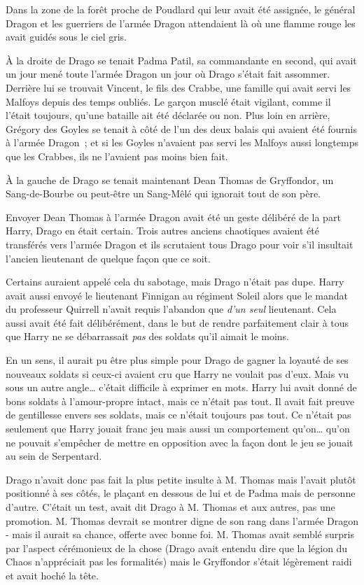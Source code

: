 \later

Dans la zone de la forêt proche de Poudlard qui leur avait été assignée, le général Dragon et les guerriers de l'armée Dragon attendaient là où une flamme rouge les avait guidés sous le ciel gris.

À la droite de Drago se tenait Padma Patil, sa commandante en second, qui avait un jour mené toute l'armée Dragon un jour où Drago s'était fait assommer. Derrière lui se trouvait Vincent, le fils des Crabbe, une famille qui avait servi les Malfoys depuis des temps oubliés. Le garçon musclé était vigilant, comme il l'était toujours, qu'une bataille ait été déclarée ou non. Plus loin en arrière, Grégory des Goyles se tenait à côté de l'un des deux balais qui avaient été fournis à l'armée Dragon~; et si les Goyles n'avaient pas servi les Malfoys aussi longtemps que les Crabbes, ils ne l'avaient pas moins bien fait.

À la gauche de Drago se tenait maintenant Dean Thomas de Gryffondor, un Sang-de-Bourbe ou peut-être un Sang-Mêlé qui ignorait tout de son père.

Envoyer Dean Thomas à l'armée Dragon avait été un geste délibéré de la part Harry, Drago en était certain. Trois autres anciens chaotiques avaient été transférés vers l'armée Dragon et ils scrutaient tous Drago pour voir s'il insultait l'ancien lieutenant de quelque façon que ce soit.

Certains auraient appelé cela du sabotage, mais Drago n'était pas dupe. Harry avait aussi envoyé le lieutenant Finnigan au régiment Soleil alors que le mandat du professeur Quirrell n'avait requis l'abandon que \emph{d'un seul} lieutenant. Cela aussi avait été fait délibérément, dans le but de rendre parfaitement clair à tous que Harry ne se débarrassait \emph{pas} des soldats qu'il aimait le moins.

En un sens, il aurait pu être plus simple pour Drago de gagner la loyauté de ses nouveaux soldats si ceux-ci avaient cru que Harry ne voulait pas d'eux. Mais vu sous un autre angle… c'était difficile à exprimer en mots. Harry lui avait donné de bons soldats à l'amour-propre intact, mais ce n'était pas tout. Il avait fait preuve de gentillesse envers ses soldats, mais ce n'était toujours pas tout. Ce n'était pas seulement que Harry jouait franc jeu mais aussi un comportement qu'on… qu'on ne pouvait s'empêcher de mettre en opposition avec la façon dont le jeu se jouait au sein de Serpentard.

Drago n'avait donc pas fait la plus petite insulte à M. Thomas mais l'avait plutôt positionné à ses côtés, le plaçant en dessous de lui et de Padma mais de personne d'autre. C'était un test, avait dit Drago à M. Thomas et aux autres, pas une promotion. M. Thomas devrait se montrer digne de son rang dans l'armée Dragon - mais il aurait sa chance, offerte avec bonne foi. M. Thomas avait semblé surpris par l'aspect cérémonieux de la chose (Drago avait entendu dire que la légion du Chaos n'appréciait pas les formalités) mais le Gryffondor s'était légèrement raidi et avait hoché la tête.

